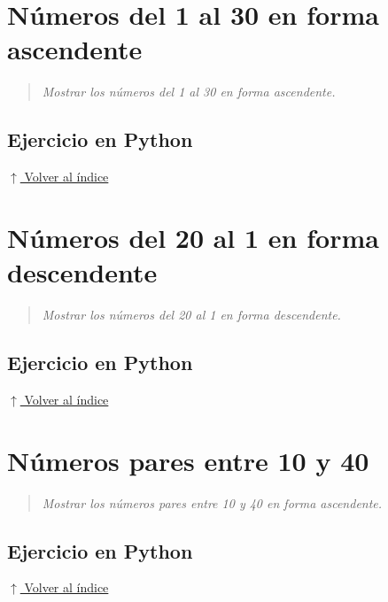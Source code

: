 \documentclass[12pt]{article}
\newcommand{\codigopython}[2]{%
}
\newcommand{\volverindice}{%
    \vspace{1em}%
    \begin{flushright}%
        \hyperlink{indice}{\small $\uparrow$ Volver al índice}%
    \end{flushright}%
}
\newcommand{\enunciado}[1]{%
    \begin{quote}
        \itshape #1
    \end{quote}
}
\begin{document}

\newpage
\section{Números del 1 al 30 en forma ascendente}

\enunciado{Mostrar los números del 1 al 30 en forma ascendente.}

\subsection*{Ejercicio en Python}

\codigopython{13}{Números del 1 al 30 en forma ascendente}

\volverindice
\newpage


\section{Números del 20 al 1 en forma descendente}

\enunciado{Mostrar los números del 20 al 1 en forma descendente.}

\subsection*{Ejercicio en Python}

\codigopython{14}{Números del 20 al 1 en forma descendente}

\volverindice
\newpage


\section{Números pares entre 10 y 40}

\enunciado{Mostrar los números pares entre 10 y 40 en forma ascendente.}

\subsection*{Ejercicio en Python}

\codigopython{15}{Números pares entre 10 y 40}

\volverindice
\newpage

\end{document}
